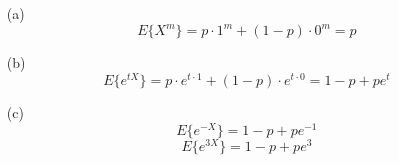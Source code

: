 \documentclass[12pt]{article}
\begin{document}
\section{}
\begin{enumerate}
\item[(a)]
\[
E\{X^m\}
= p\cdot 1^m + (1-p)\cdot 0^m
= p
\]
\item[(b)]
\[
E\bigl\{e^{tX}\bigr\}
= p\cdot e^{t\cdot 1} + (1-p)\cdot e^{t\cdot 0}
= 1 - p + pe^t
\]
\item[(c)]
\[
E\bigl\{e^{-X}\bigr\}
= 1 - p + pe^{-1}
\]
\[
E\bigl\{e^{3X}\bigr\}
= 1 - p + pe^3
\]

\end{enumerate}
\end{document}
